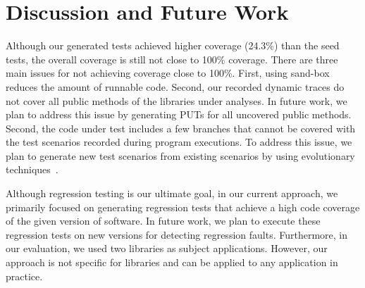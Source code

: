 \section{Discussion and Future Work}
\label{sec:discussion}

Although our generated tests achieved higher coverage (24.3\%) than the seed tests, the overall coverage is still not close to 100\% coverage. There are three main issues for not achieving coverage close to 100\%. First, using sand-box reduces the amount of runnable code. Second, our recorded dynamic traces do not cover all public methods of the libraries under analyses. In future work, we plan to address this issue by generating PUTs for all uncovered public methods. Second, the code under test includes a few branches that cannot be covered with the test scenarios recorded during program executions. To address this issue, we plan to generate new test scenarios from existing scenarios by using evolutionary techniques~\cite{tonella:etoc}.

Although regression testing is our ultimate goal, in our current approach, we primarily focused on generating regression tests that achieve a high code coverage of the given version of software. In future work, we plan to execute these regression tests on new versions for detecting regression faults. Furthermore, in our evaluation, we used two libraries as subject applications. However, our approach is not specific for libraries and can be applied to any application in practice.